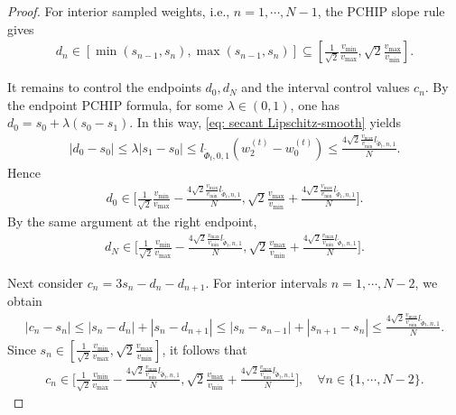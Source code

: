 \documentclass{article}
\newcommand{\Farc}{\Phi}
\begin{document}
\begin{proof}
For interior sampled weights, i.e., $n=1,\cdots,N-1$, the PCHIP slope rule gives
\begin{align}
d_n\in[\min(s_{n-1},s_n), \max(s_{n-1},s_n)]\subseteq\left[\frac{1}{\sqrt2}\frac{v_{\min}}{v_{\max}},\sqrt2\frac{v_{\max}}{v_{\min}}\right].
\end{align}

It remains to control the endpoints $d_0,d_N$ and the interval control values $c_n$.
By the endpoint PCHIP formula, for some $\lambda\in(0,1)$,
one has $d_0=s_0+\lambda(s_0-s_1)$. In this way, \eqref{eq: secant Lipschitz-smooth} yields
\begin{align}
|d_0-s_0|
\le
\lambda|s_1-s_0|
\le
l_{\tilde \Farc_t,0,1}(w_2^{(t)}-w_0^{(t)})
\le
\frac{4 \sqrt{2}\frac{v_{\max}}{v_{\min}}l_{\tilde \Farc_t,n,1}}{N}.
\end{align}
Hence
\begin{align}
d_0\in\Big[\frac{1}{\sqrt2}\frac{v_{\min}}{v_{\max}}-\frac{4 \sqrt{2}\frac{v_{\max}}{v_{\min}}l_{\tilde \Farc_t,n,1}}{N}, \sqrt2\frac{v_{\max}}{v_{\min}}+\frac{4 \sqrt{2}\frac{v_{\max}}{v_{\min}}l_{\tilde \Farc_t,n,1}}{N}\Big].
\end{align}
By the same argument at the right endpoint,
\begin{align}
d_N\in\Big[\frac{1}{\sqrt2}\frac{v_{\min}}{v_{\max}}-\frac{4 \sqrt{2}\frac{v_{\max}}{v_{\min}}l_{\tilde \Farc_t,n,1}}{N}, \sqrt2\frac{v_{\max}}{v_{\min}}+\frac{4 \sqrt{2}\frac{v_{\max}}{v_{\min}}l_{\tilde \Farc_t,n,1}}{N}\Big].
\end{align}

Next consider $c_n=3s_n-d_n-d_{n+1}$. For interior intervals $n=1,\cdots,N-2$, we obtain
\begin{align}
|c_n-s_n|
\le
|s_n-d_n|+|s_n-d_{n+1}|
\le
|s_n-s_{n-1}|+|s_{n+1}-s_n|
\le
\frac{4 \sqrt{2}\frac{v_{\max}}{v_{\min}}l_{\tilde \Farc_t,n,1}}{N}.
\end{align}
Since $s_n\in\left[\frac{1}{\sqrt2}\frac{v_{\min}}{v_{\max}},\sqrt2\frac{v_{\max}}{v_{\min}}\right]$, it follows that
\begin{align}
c_n\in
\Big[\frac{1}{\sqrt2}\frac{v_{\min}}{v_{\max}}-\frac{4 \sqrt{2}\frac{v_{\max}}{v_{\min}}l_{\tilde \Farc_t,n,1}}{N}, \sqrt2\frac{v_{\max}}{v_{\min}}+\frac{4 \sqrt{2}\frac{v_{\max}}{v_{\min}}l_{\tilde \Farc_t,n,1}}{N}\Big],
\quad \forall n\in\{1,\cdots,N-2\}.
\end{align}


\end{proof}
\end{document}
